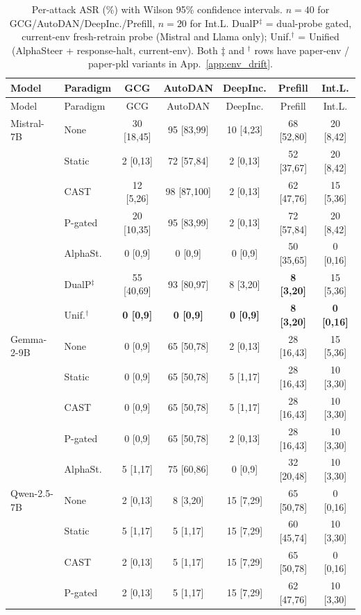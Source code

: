 \documentclass{article}
\begin{document}
\begin{longtable}{ll ccccc}
\caption{Per-attack ASR (\%) with Wilson 95\% confidence intervals. $n=40$ for GCG/AutoDAN/DeepInc./Prefill, $n=20$ for Int.L. DualP$^{\ddagger}$ = dual-probe gated, current-env fresh-retrain probe (Mistral and Llama only); Unif.$^{\dagger}$ = Unified (AlphaSteer + response-halt, current-env). Both ‡ and $^{\dagger}$ rows have paper-env / paper-pkl variants in App.~\ref{app:env_drift}.}\label{tab:wilson}\\
\toprule
Model & Paradigm & GCG & AutoDAN & DeepInc. & Prefill & Int.L. \\
\midrule
\endfirsthead
\toprule
Model & Paradigm & GCG & AutoDAN & DeepInc. & Prefill & Int.L. \\
\midrule
\endhead
Mistral-7B & None & 30 [18,45] & 95 [83,99] & 10 [4,23] & 68 [52,80] & 20 [8,42] \\
 & Static & 2 [0,13] & 72 [57,84] & 2 [0,13] & 52 [37,67] & 20 [8,42] \\
 & CAST & 12 [5,26] & 98 [87,100] & 2 [0,13] & 62 [47,76] & 15 [5,36] \\
 & P-gated & 20 [10,35] & 95 [83,99] & 2 [0,13] & 72 [57,84] & 20 [8,42] \\
 & AlphaSt. & 0 [0,9] & 0 [0,9] & 0 [0,9] & 50 [35,65] & 0 [0,16] \\
 & DualP$^{\ddagger}$ & 55 [40,69] & 93 [80,97] & 8 [3,20] & \textbf{8 [3,20]} & 15 [5,36] \\
 & Unif.$^{\dagger}$ & \textbf{0 [0,9]} & \textbf{0 [0,9]} & \textbf{0 [0,9]} & \textbf{8 [3,20]} & \textbf{0 [0,16]} \\
\midrule
Gemma-2-9B & None & 0 [0,9] & 65 [50,78] & 2 [0,13] & 28 [16,43] & 15 [5,36] \\
 & Static & 0 [0,9] & 65 [50,78] & 5 [1,17] & 28 [16,43] & 10 [3,30] \\
 & CAST & 0 [0,9] & 65 [50,78] & 5 [1,17] & 28 [16,43] & 10 [3,30] \\
 & P-gated & 0 [0,9] & 65 [50,78] & 2 [0,13] & 28 [16,43] & 10 [3,30] \\
 & AlphaSt. & 5 [1,17] & 75 [60,86] & 0 [0,9] & 32 [20,48] & 10 [3,30] \\
\midrule
Qwen-2.5-7B & None & 2 [0,13] & 8 [3,20] & 15 [7,29] & 65 [50,78] & 0 [0,16] \\
 & Static & 5 [1,17] & 5 [1,17] & 15 [7,29] & 60 [45,74] & 10 [3,30] \\
 & CAST & 2 [0,13] & 5 [1,17] & 15 [7,29] & 65 [50,78] & 0 [0,16] \\
 & P-gated & 2 [0,13] & 5 [1,17] & 15 [7,29] & 62 [47,76] & 10 [3,30] \\

\end{longtable}
\end{document}
